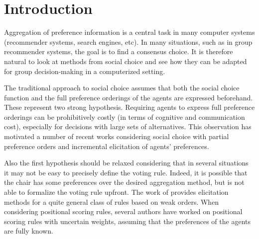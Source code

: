 \section{Introduction}
Aggregation of preference information is a central task in many computer systems (recommender systems, search engines, etc).
In many situations, such as in group recommender systems, the goal is to find a consensus choice.
It is therefore natural to look at methods from social choice and see how they can be adapted for group decision-making in a computerized setting.

The traditional approach to social choice assumes that both the social choice function and the full preference orderings of the agents are expressed beforehand. These represent two strong hypothesis.
Requiring agents to express full preference orderings can be prohibitively costly (in terms of cognitive and communication cost), especially for decisions with large sets of alternatives.
This observation has motivated a number of recent works considering social choice with partial preference orders \citep{Xia2008, Pini2009, Konczak05} and incremental elicitation \citep{Kalech2011, Lu2011, Naamani-Dery2015} of agents’ preferences. 

Also the first hypothesis should be relaxed considering that in several situations it may not be easy to precisely define the voting rule.
Indeed, it is possible that the chair has some preferences over the desired aggregation method, but is not able to formalize the voting rule upfront.
The work of \citet{Cailloux2014} provides elicitation methods for a quite general class of rules based on weak orders.
When considering positional scoring rules, several authors \citep{Stein1994, Llamazares2013, Viappiani2018} have worked on positional scoring rules with uncertain weights, assuming that the preferences of the agents are fully known.

